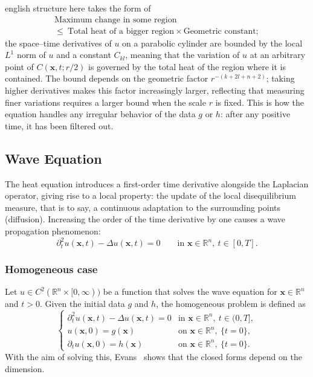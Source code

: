\documentclass[0000.tex]{subfiles}
\begin{document}
\begin{hyphenrules}{english}
structure here takes the form of
\[
  \begin{gathered}
  \text{Maximum change in some region}\\
  \le\ \text{Total heat of a bigger region}\times\text{Geometric constant};
  \end{gathered}
\]
the space--time derivatives of $u$ on a parabolic cylinder are bounded by the local $L^1$ norm of $u$
and a constant $C_{kl}$, meaning that the variation of $u$ at an arbitrary point of $C(\mathbf{x},t;r/2)$ is
governed by the total heat of the region where it is contained. The bound depends on the geometric factor
$r^{-(k+2l+n+2)}$; taking higher derivatives makes this factor increasingly larger, reflecting that
measuring finer variations requires a larger bound when the scale $r$ is fixed. This is how the
equation handles any irregular behavior of the data $g$ or $h$: after any positive time, it has been
filtered out.

\subsection{Wave Equation}\label{subsec:wave}

The heat equation introduces a first-order time derivative alongside the Laplacian operator, giving
rise to a local property: the update of the local disequilibrium measure, that is to say, a continuous
adaptation to the surrounding points (diffusion). Increasing the order of the time derivative by one
causes a wave propagation phenomenon:
\begin{equation}
  \partial_t^2u(\mathbf{x},t)-\Delta u(\mathbf{x},t)=0\qquad\text{in } \mathbf{x}\in\mathbb{R}^n,\ t\in[0,T].
  \label{eq:wave}
\end{equation}

\subsubsection{Homogeneous case}
Let $u\in C^2(\mathbb{R}^n\times[0,\infty))$ be a function that solves the wave equation for $\mathbf{x}\in\mathbb{R}^n$ and
$t>0$. Given the initial data $g$ and $h$, the homogeneous problem is defined as
\begin{equation}
  \begin{cases}
    \partial_t^2u(\mathbf{x},t)-\Delta u(\mathbf{x},t)=0 & \text{in } \mathbf{x}\in\mathbb{R}^n,\ t\in(0,T],\\
    u(\mathbf{x},0)=g(\mathbf{x}) & \text{on } \mathbf{x}\in\mathbb{R}^n,\ \{t=0\},\\
    \partial_t u(\mathbf{x},0)=h(\mathbf{x}) & \text{on } \mathbf{x}\in\mathbb{R}^n,\ \{t=0\}.
  \end{cases}
  \label{eq:wave-cauchy}
\end{equation}
With the aim of solving this, Evans~\cite{evans2010} shows that the closed forms depend on the dimension.


\end{hyphenrules}
\end{document}

